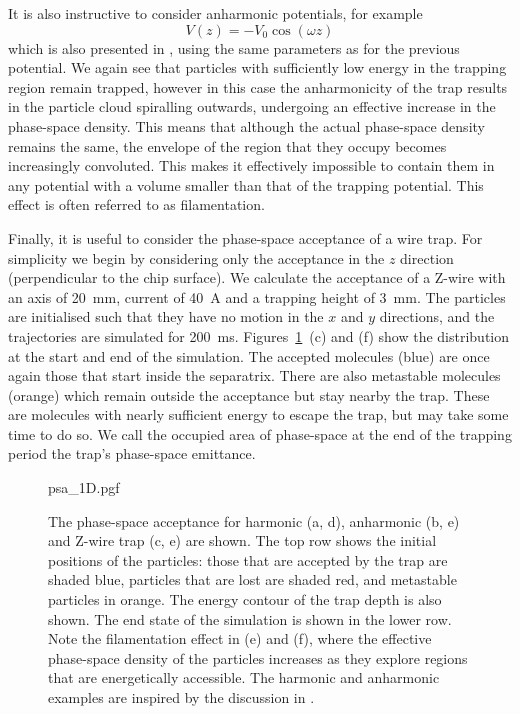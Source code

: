 It is also instructive to consider anharmonic potentials, for example
%
\begin{equation}
  V(z) = -V_0\cos(\omega z)
\end{equation}
%
which is also presented in , using the same
parameters as for the previous potential. We again see that particles with
sufficiently low energy in the trapping region remain trapped, however in this
case the anharmonicity of the trap results in the particle cloud spiralling
outwards, undergoing an effective increase in the phase-space density. This
means that although the actual phase-space density remains the same, the
envelope of the region that they occupy becomes increasingly convoluted. This
makes it effectively impossible to contain them in any potential with a volume
smaller than that of the trapping potential. This effect is often referred to
as filamentation.

Finally, it is useful to consider the phase-space acceptance of a wire trap.
For simplicity we begin by considering only the acceptance in the $z$ direction
(perpendicular to the chip surface). We calculate the acceptance of a Z-wire
with an axis of \SI{20}{\milli\meter}, current of \SI{40}{\ampere} and a
trapping height of \SI{3}{\milli\meter}. The particles are initialised such
that they have no motion in the $x$ and $y$ directions, and the trajectories
are simulated for \SI{200}{\milli\second}. Figures~\ref{design:fig:psaeg}~(c)
and (f) show the distribution at the start and end of the simulation.
The accepted molecules (blue) are once again those that start inside the
separatrix. There are also metastable molecules (orange) which remain outside
the acceptance but stay nearby the trap. These are molecules with nearly
sufficient energy to escape the trap, but may take some time to do so.
We call the occupied area of phase-space at the end of the trapping
period the trap's phase-space emittance.

\begin{figure}[htb]
  \centering
  {psa_1D.pgf}
  \caption{
    The phase-space acceptance for harmonic (a, d), anharmonic (b, e) and
    Z-wire trap (c, e) are shown. The top row shows the initial positions of
    the particles: those that are accepted by the trap are shaded blue,
    particles that are lost are shaded red, and metastable particles in orange.
    The energy contour of the trap depth is also shown. The end state of the
    simulation is shown in the lower row. Note the filamentation effect in (e)
    and (f), where the effective phase-space density of the particles increases
    as they explore regions that are energetically accessible. The harmonic and
    anharmonic examples are inspired by the discussion in
    .
  }
  \label{design:fig:psaeg}
\end{figure}

